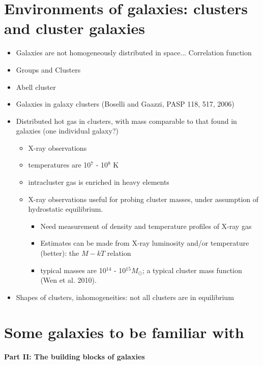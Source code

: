 \documentclass{article}
\begin{document}
\section{Environments of galaxies: clusters and cluster galaxies}
    \begin{itemize}
      \item Galaxies are not homogeneously distributed in space...
      Correlation function
      \item Groups and Clusters
      \item Abell cluster
      \item Galaxies in galaxy clusters (Boselli and Gaazzi, PASP 118,
      517, 2006)
      \item Distributed hot gas in clusters, with mass comparable to
      that found in galaxies (one individual galaxy?)
      \begin{itemize}
        \item X-ray observations
        \item temperatures are 10$^7$ - 10$^8$ K
        \item intracluster gas is enriched in heavy elements
        \item X-ray observations useful for probing cluster masses,
        under assumption of hydrostatic equilibrium.
        \begin{itemize}
          \item Need measurement of density and temperature profiles
          of X-ray gas
          \item Estimates can be made from X-ray luminosity and/or
          temperature (better): the $M - kT$ relation
          \item typical masses are 10$^{14}$ - 10$^{15} M_{\odot}$; a
          typical cluster mass function (Wen et al. 2010).
        \end{itemize}
      \end{itemize}
      \item Shapes of clusters, inhomogeneities: not all clusters are
      in equilibrium
    \end{itemize}

\section{Some galaxies to be familiar with}

\newpage
\begin{center}
    \fontsize{20}{22}\selectfont\textbf{Part II: The building blocks of galaxies}
\end{center}
\end{document}
